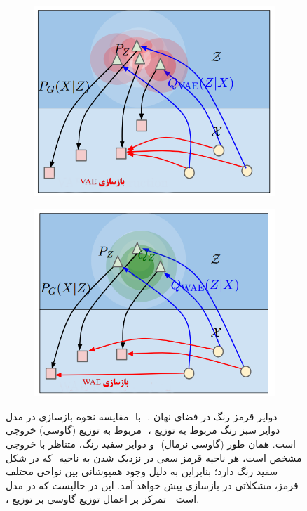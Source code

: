 \begin{figure}[H]
	\centering
	\begin{subfigure}[b]{0.4\textwidth}
		\includegraphics[width=\textwidth]{images/wae1.png}
		\caption{\vae}
		\label{fig:wae-vae}
	\end{subfigure}
	\begin{subfigure}[b]{0.4\textwidth}
		\includegraphics[width=\textwidth]{images/wae2.png}
		\caption{\wae}
		\label{fig:wae-wae}
	\end{subfigure}
	\caption{
		مقایسه نحوه بازسازی در مدل  ‎‎\wae{}‎ با ‎\vae{}‎ . دوایر قرمز رنگ در فضای نهان مربوط به توزیع (گاوسی) خروجی ‎\encoder{}‎ ، دوایر سبز رنگ مربوط به توزیع ‎‎\marginal{}‎ خروجی ‎\encoder{}‎ و  دوایر سفید رنگ، متناظر با ‎\priordist{}‎ (گاوسی نرمال) است. همان طور که در شکل ‎‎ مشخص است، هر ناحیه قرمز سعی در نزدیک شدن به ناحیه سفید رنگ دارد؛ بنابراین به دلیل وجود همپوشانی بین نواحی مختلف قرمز، مشکلاتی در بازسازی پیش خواهد آمد. این در حالیست که در مدل ‎\wae{}‎ ، تمرکز بر اعمال توزیع گاوسی بر توزیع ‎\marginal{}‎ \encoder{}‎‎ است.
	}
	\label{fig:wae}
\end{figure}
